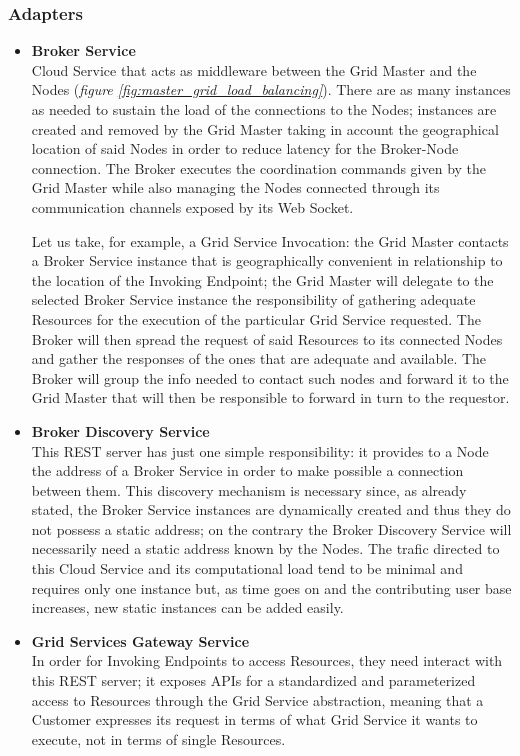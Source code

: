\subsubsection{Adapters}
\begin{itemize}
    \item \textbf{Broker Service}\\
    Cloud Service that acts as middleware between the Grid Master and the Nodes (\textit{figure \ref{fig:master_grid_load_balancing}}). There are as many instances as needed to sustain the load of the connections to the Nodes; instances are created and removed by the Grid Master taking in account the geographical location of said Nodes in order to reduce latency for the Broker-Node connection.
    The Broker executes the coordination commands given by the Grid Master while also managing the Nodes connected through its communication channels exposed by its Web Socket.
    
    Let us take, for example, a Grid Service Invocation: the Grid Master contacts a Broker Service instance that is geographically convenient in relationship to the location of the Invoking Endpoint; the Grid Master will delegate to the selected Broker Service instance the responsibility of gathering adequate Resources for the execution of the particular Grid Service requested. The Broker will then spread the request of said Resources to its connected Nodes and gather the responses of the ones that are adequate and available. The Broker will group the info needed to contact such nodes and forward it to the Grid Master that will then be responsible to forward in turn to the requestor.

    \item \textbf{Broker Discovery Service}\\
    This REST server has just one simple responsibility: it provides to a Node the address of a Broker Service in order to make possible a connection between them. This discovery mechanism is necessary since, as already stated, the Broker Service instances are dynamically created and thus they do not possess a static address; on the contrary the Broker Discovery Service will necessarily need a static address known by the Nodes. The trafic directed to this Cloud Service and its computational load tend to be minimal and requires only one instance but, as time goes on and the contributing user base increases, new static instances can be added easily.

    \item \textbf{Grid Services Gateway Service}\\
    In order for Invoking Endpoints to access Resources, they need interact with this REST server; it exposes APIs for a standardized and parameterized access to Resources through the Grid Service abstraction, meaning that a Customer expresses its request in terms of what Grid Service it wants to execute, not in terms of single Resources.
    

\end{itemize}
